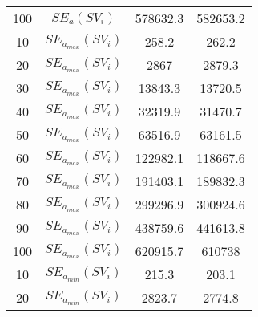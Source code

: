 \begin{table}[H]
\begin{tabular}{cc|cc}
		100                                                         & $SE_{a}(SV_i)$                      & 578632.3                     & 582653.2                     \\
		10                                                          & $SE_{a_{max}}(SV_i)$                       & 258.2                        & 262.2                        \\
		20                                                          & $SE_{a_{max}}(SV_i)$                       & 2867                         & 2879.3                       \\
		30                                                          & $SE_{a_{max}}(SV_i)$                       & 13843.3                      & 13720.5                      \\
		40                                                          & $SE_{a_{max}}(SV_i)$                       & 32319.9                      & 31470.7                      \\
		50                                                          & $SE_{a_{max}}(SV_i)$                       & 63516.9                      & 63161.5                      \\
		60                                                          & $SE_{a_{max}}(SV_i)$                       & 122982.1                     & 118667.6                     \\
		70                                                          & $SE_{a_{max}}(SV_i)$                       & 191403.1                     & 189832.3                     \\
		80                                                          & $SE_{a_{max}}(SV_i)$                       & 299296.9                     & 300924.6                     \\
		90                                                          & $SE_{a_{max}}(SV_i)$                       & 438759.6                     & 441613.8                     \\
		100                                                         & $SE_{a_{max}}(SV_i)$                       & 620915.7                     & 610738                       \\
		10                                                          & $SE_{a_{min}}(SV_i)$                     & 215.3                        & 203.1                        \\
		20                                                          & $SE_{a_{min}}(SV_i)$                     & 2823.7                       & 2774.8                       \\

\end{tabular}
\end{table}
